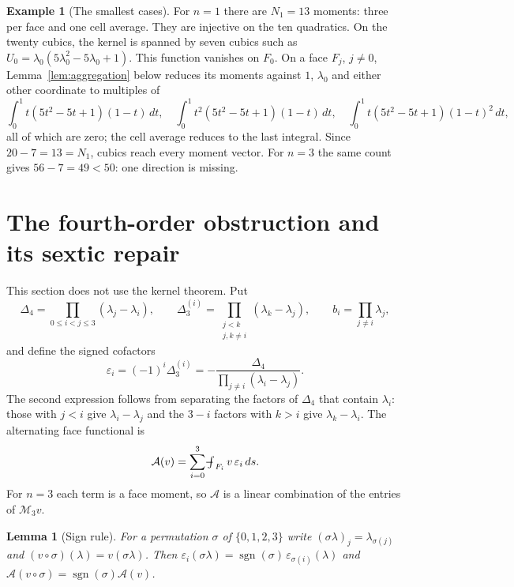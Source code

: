 \documentclass[11pt,a4paper]{article}
\newtheorem{lemma}[theorem]{Lemma}
\theoremstyle{definition}
\newtheorem{example}[theorem]{Example}
\theoremstyle{remark}
\newcommand{\M}{\mathcal M}
\newcommand{\avg}{\mathop{\mathchoice{{\textstyle\int}\mkern-15.5mu{-}\mkern2mu}{\int\mkern-12mu{-}\mkern1mu}{\int\mkern-11mu{-}}{\int\mkern-11mu{-}}}\nolimits}
\begin{document}
\begin{example}[The smallest cases]
\label{ex:small}
For \(n=1\) there are \(N_1=13\) moments: three per face and one
cell average. They are injective on the ten quadratics. On the twenty
cubics, the kernel is spanned by seven cubics such as
\(U_0=\lambda_0(5\lambda_0^2-5\lambda_0+1)\). This function vanishes on
\(F_0\). On a face \(F_j\), \(j\ne0\), Lemma~\ref{lem:aggregation} below reduces its
moments against \(1\), \(\lambda_0\) and either other coordinate to multiples of
\[
 \int_0^1 t(5t^2-5t+1)(1-t)\,dt,\quad
 \int_0^1 t^2(5t^2-5t+1)(1-t)\,dt,\quad
 \int_0^1 t(5t^2-5t+1)(1-t)^2\,dt,
\]
all of which are zero; the cell average reduces to the last integral. Since
\(20-7=13=N_1\), cubics reach every moment vector. For \(n=3\) the same
count gives \(56-7=49<50\): one direction is missing.
\end{example}

\section{The fourth-order obstruction and its sextic repair}
\label{sec:alternating}

This section does not use the kernel theorem. Put
\[
 \Delta_4=\prod_{0\le i<j\le3}(\lambda_j-\lambda_i),\qquad
 \Delta_3^{(i)}=\prod_{\substack{j<k\\ j,k\ne i}}(\lambda_k-\lambda_j),
 \qquad b_i=\prod_{j\ne i}\lambda_j,
\]
and define the signed cofactors
\begin{equation}
 \varepsilon_i=(-1)^i\Delta_3^{(i)}
 =-\frac{\Delta_4}{\prod_{j\ne i}(\lambda_i-\lambda_j)} .
 \label{eq:cofactor}
\end{equation}
The second expression follows from separating the factors of
\(\Delta_4\) that contain \(\lambda_i\): those with \(j<i\) give
\(\lambda_i-\lambda_j\) and the \(3-i\) factors with \(k>i\) give
\(\lambda_k-\lambda_i\). The alternating face functional is
\begin{equation}
 \mathcal A(v)=\sum_{i=0}^3\avg_{F_i}v\,\varepsilon_i\,ds .
 \label{eq:alternating}
\end{equation}
For \(n=3\) each term is a face moment, so \(\mathcal A\) is a linear
combination of the entries of \(\M_3v\).

\begin{lemma}[Sign rule]
\label{lem:sign}
For a permutation \(\sigma\) of \(\{0,1,2,3\}\) write
\((\sigma\lambda)_j=\lambda_{\sigma(j)}\) and \((v\circ\sigma)(\lambda)=v(\sigma\lambda)\).
Then \(\varepsilon_i(\sigma\lambda)=\operatorname{sgn}(\sigma)\,
\varepsilon_{\sigma(i)}(\lambda)\) and
\(\mathcal A(v\circ\sigma)=\operatorname{sgn}(\sigma)\mathcal A(v)\).
\end{lemma}
\end{document}
